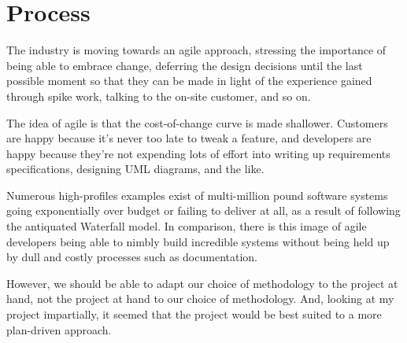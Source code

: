 \section{Process} %

The industry is moving towards an agile approach, stressing the importance of being able to embrace change, deferring the design decisions until the last possible moment so that they can be made in light of the experience gained through spike work, talking to the on-site customer, and so on.

The idea of agile is that the cost-of-change curve is made shallower. Customers are happy because it's never too late to tweak a feature, and developers are happy because they're not expending lots of effort into writing up requirements specifications, designing UML diagrams, and the like.

Numerous high-profiles examples exist of multi-million pound software systems going exponentially over budget or failing to deliver at all, as a result of following the antiquated Waterfall model. In comparison, there is this image of agile developers being able to nimbly build incredible systems without being held up by dull and costly processes such as documentation.

However, we should be able to adapt our choice of methodology to the project at hand, not the project at hand to our choice of methodology. And, looking at my project impartially, it seemed that the project would be best suited to a more plan-driven approach.

